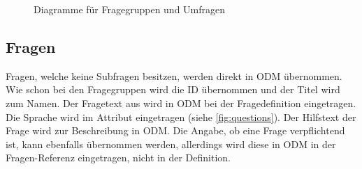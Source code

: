 \begin{figure}[h]
		\caption{Diagramme für Fragegruppen und Umfragen}
\end{figure}

\subsection{Fragen}

Fragen, welche keine Subfragen besitzen, werden direkt in ODM übernommen.
Wie schon bei den Fragegruppen wird die ID übernommen und der Titel wird zum Namen.
Der Fragetext aus  wird in ODM bei  der Fragedefinition eingetragen. Die Sprache wird im Attribut  eingetragen (siehe \cref{fig:questions}).
Der Hilfstext der Frage wird zur Beschreibung in ODM.
Die Angabe, ob eine Frage verpflichtend ist, kann ebenfalls übernommen werden, allerdings wird diese in ODM in der Fragen-Referenz eingetragen, nicht in der Definition.

